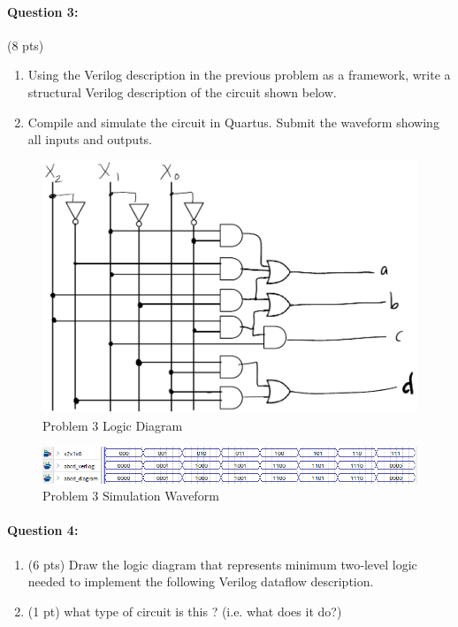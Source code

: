 \documentclass[12pt,letterpaper,titlepage]{report}
\begin{document}
\begin{raggedright}
\clearpage

\paragraph{Question 3:}
(8 pts)
\begin{enumerate} [noitemsep, label=\alph*)]
\item Using the Verilog description in the previous problem as a framework, write a structural Verilog description of the circuit shown below. 
\item Compile and simulate the circuit in Quartus. Submit the waveform showing all inputs and outputs.
\end{enumerate}
\begin{figure}[ht]
\centering
\includegraphics[width=\textwidth, height=\textheight, keepaspectratio=true]{hw9p3a}
\caption{Problem 3 Logic Diagram}
\end{figure}
\clearpage


\begin{figure}[ht]
\centering
\includegraphics[width=\textwidth, height=\textheight, keepaspectratio=true]{hw9p3b}
\caption{Problem 3 Simulation Waveform}
\end{figure}

\clearpage
\paragraph{Question 4:}
\begin{enumerate} [noitemsep, label=\alph*)]
\item (6 pts) Draw the logic diagram that represents minimum two‐level logic needed to implement the following Verilog dataflow description.
\item (1 pt) what type of circuit is this ? (i.e. what does it do?)
\end{enumerate}


\end{raggedright}
\end{document}
